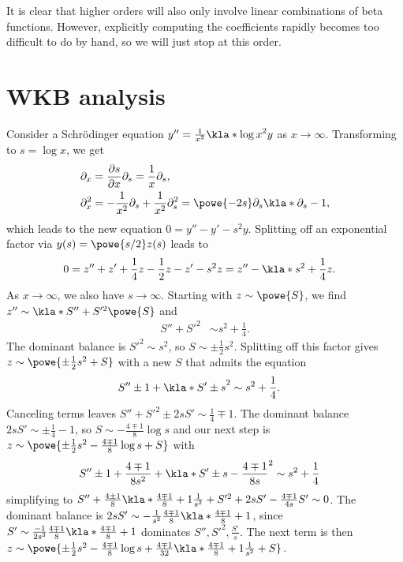 \documentclass[english, parskip=full]{scrartcl}
\begin{document}
It is clear that higher orders will also only involve linear combinations of beta functions.
However, explicitly computing the coefficients rapidly becomes too difficult to do by hand, so we will just stop at this order.

\section{WKB analysis}
Consider a Schrödinger equation $y''=\frac{1}{x^2}\kla*{\log x}^2 y$ as $x\rightarrow\infty$.
Transforming to $s=\log x$, we get
\begin{align}
\partial_x &= \frac{\partial s}{\partial x} \partial_s = \frac{1}{x} \partial_s,\\
\partial_x^2 &= -\frac{1}{x^2}\partial_s + \frac{1}{x^2} \partial_s^2 = \powe{-2s} \partial_s \kla*{\partial_s - 1},
\end{align}
which leads to the new equation $0 = y'' - y' - s^2 y$.
Splitting off an exponential factor via $y(s) = \powe{s/2}z(s)$ leads to
\begin{align}
0 &= z'' + z' + \frac{1}{4} z - \frac{1}{2} z - z' - s^2z = z'' - \kla*{s^2 + \frac{1}{4}}z.
\end{align}
As $x\rightarrow\infty$, we also have $s\rightarrow\infty$.
Starting with $z\sim \powe{S}$, we find $z''\sim \kla*{S''+S'^2}\powe{S}$ and
\begin{align}
S''+S'^2 &\sim s^2+\frac{1}{4}.
\end{align}
The dominant balance is $S'^2 \sim s^2$, so $S\sim \pm\frac{1}{2}s^2$.
Splitting off this factor gives $z\sim \powe{\pm\frac{1}{2}s^2 + S}$ with a new $S$ that admits the equation
\begin{align}
S''\pm 1+\kla*{S'\pm s}^2 &\sim s^2+\frac{1}{4}.
\end{align}
Canceling terms leaves $S'' +S'^2 \pm 2sS' \sim \frac{1}{4} \mp 1$.
The dominant balance $2sS'\sim \pm\frac{1}{4} - 1$, so $S\sim -\frac{4\mp 1}{8}\log s$ and our next step is $z\sim \powe{\pm \frac{1}{2}s^2 - \frac{4\mp 1}{8}\log s + S}$
with
\begin{align}
S''\pm 1+\frac{4\mp 1}{8s^2} + \kla*{S'\pm s-\frac{4\mp 1}{8s}}^2 &\sim s^2 + \frac{1}{4}
\end{align}
simplifying to $S''+ \frac{4\pm 1}{8} \kla*{\frac{4\mp 1}{8} +1} \frac{1}{s^2} + S'^2 + 2sS' - \frac{4\mp 1}{4s}S' \sim 0$.
The dominant balance is $2sS' \sim -\frac{1}{s^2} \frac{4\mp 1}{8} \kla*{\frac{4\mp 1}{8}+1}$, since $S' \sim \frac{-1}{2s^3} \frac{4\mp 1}{8} \kla*{\frac{4\mp 1}{8}+1}$ dominates $S'',S'^2,\frac{S'}{s}$.
The next term is then $z\sim \powe{\pm\frac{1}{2}s^2 - \frac{4\mp 1}{8}\log s + \frac{4\mp 1}{32} \kla*{\frac{4\mp 1}{8}+1} \frac{1}{s^2} + S}$.
\end{document}
